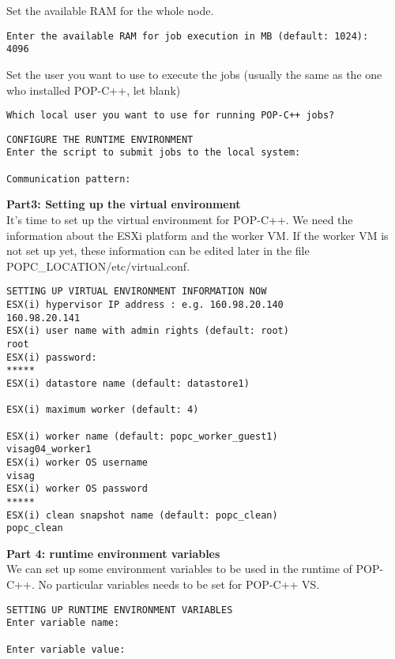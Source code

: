 Set the available RAM for the whole node.
\begin{lstlisting}
Enter the available RAM for job execution in MB (default: 1024):
4096
\end{lstlisting}\s

Set the user you want to use to execute the jobs (usually the same as the one who installed POP-C++, let blank)
\begin{lstlisting}
Which local user you want to use for running POP-C++ jobs?

\end{lstlisting}\s


\begin{lstlisting}
CONFIGURE THE RUNTIME ENVIRONMENT
Enter the script to submit jobs to the local system:

Communication pattern:

\end{lstlisting}\s

\pagebreak
\textbf{Part3: Setting up the virtual environment}\\
It's time to set up the virtual environment for POP-C++. We need the information about the ESXi platform and the worker VM. If the worker VM is not set up yet, these information can be edited later in the file POPC\_LOCATION/etc/virtual.conf.
\begin{lstlisting}
SETTING UP VIRTUAL ENVIRONMENT INFORMATION NOW
ESX(i) hypervisor IP address : e.g. 160.98.20.140
160.98.20.141
ESX(i) user name with admin rights (default: root)
root
ESX(i) password:
*****
ESX(i) datastore name (default: datastore1)

ESX(i) maximum worker (default: 4)

ESX(i) worker name (default: popc_worker_guest1)
visag04_worker1
ESX(i) worker OS username
visag
ESX(i) worker OS password
*****
ESX(i) clean snapshot name (default: popc_clean)
popc_clean
\end{lstlisting}\s





\textbf{Part 4: runtime environment variables}\\
We can set up some environment variables to be used in the runtime of POP-C++. No particular variables needs to be set for POP-C++ VS.
\begin{lstlisting}
SETTING UP RUNTIME ENVIRONMENT VARIABLES
Enter variable name:

Enter variable value:

\end{lstlisting}\s

